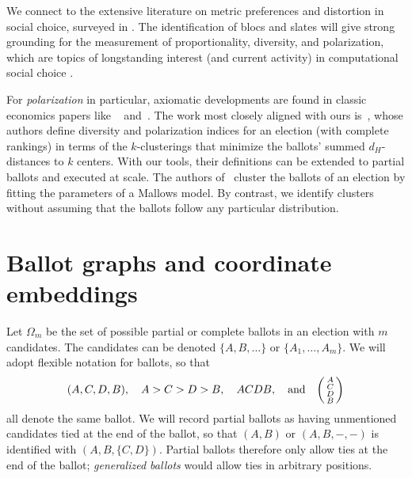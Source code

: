 \documentclass{amsart}
\theoremstyle{plain}
\theoremstyle{definition}
\theoremstyle{remark}
\begin{document}
We connect to the extensive literature on metric preferences and distortion in social choice, surveyed in \cite{anshelevich2021distortion}.
The identification of blocs and slates will give strong grounding for the measurement of proportionality, diversity, and polarization, which are topics of longstanding interest (and current activity) in computational social choice \cite{skowron2017proportional,israel2025dynamic,hashemi2014measuring,karpov2017preference}.

For \emph{polarization} in particular, axiomatic developments are found in classic economics papers like ~\cite{Esteban_Ray_1991} and~\cite{can2015polarization}.  The work most closely aligned with ours is~\cite{Faliszewski_Kaczmarczyk_Sornat_Szufa_Wąs_2023}, whose authors define diversity and polarization indices for an election (with complete rankings) in terms of the $k$-clusterings that minimize the ballots' summed $d_H$-distances to $k$ centers.  With our tools, their definitions can be extended to partial ballots and executed at scale.
The authors of~\cite{Busse_Orbanz_Buhmann_2007} cluster the ballots of an election by fitting the parameters of a Mallows model.  By contrast, we identify clusters without assuming that the ballots follow any particular distribution.


  



\section{Ballot graphs and coordinate embeddings}\label{S:ballotgraph}\label{S:coords}

Let $\Omega_m$ be the set of possible partial or complete ballots in an election with $m$ candidates. The candidates can be denoted $\{A,B,\dots \}$ or $\{A_1,\dots,A_m\}$.  We will adopt flexible notation for ballots, so that 
$$(A,C,D,B),\quad  A>C>D>B,\quad  ACDB,\quad  \hbox{\rm and} \quad 
\begin{psmallmatrix}A\\ C\\ D\\ B\end{psmallmatrix}$$ 
all denote the same ballot.  We will record partial ballots as having unmentioned candidates tied at the end of the ballot, so that 
$(A,B)$ or $(A,B,-,-)$ is identified with $(A,B,\{C,D\})$.
Partial ballots therefore only allow ties at the end of the ballot;
 {\em generalized ballots} would allow ties in arbitrary positions.
\end{document}
